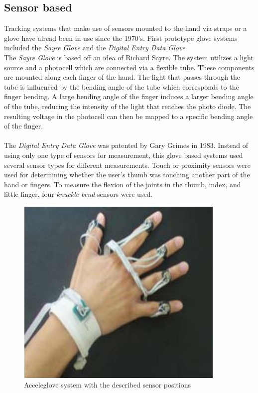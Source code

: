 \subsection{Sensor based}
\label{Sensor based}
Tracking systems that make use of sensors mounted to the hand via straps or a glove have alread been in use since the 1970's. First prototype glove systems included the \textit{Sayre Glove}\cite{ThomasA.DeFanti.1977} and the \textit{Digital Entry Data Glove}\cite{Grimes.1983}.\\
The \textit{Sayre Glove} is based off an idea of Richard Sayre. The system utilizes a light source and a photocell which are connected via a flexible tube. These components are mounted along each finger of the hand. The light that passes through the tube is influenced by the bending angle of the tube which corresponds to the finger bending.
A large bending angle of the finger induces a larger bending angle of the tube, reducing the intensity of the light that reaches the photo diode. The resulting voltage in the photocell can then be mapped to a specific bending angle of the finger.\\\\
The \textit{Digital Entry Data Glove} was patented by Gary Grimes in 1983. Instead of using only one type of sensors for measurement, this glove based systems used several sensor types for different measurements.
Touch or proximity sensors were used for determining whether the user's thumb was touching another part of the hand or fingers. To measure the flexion of the joints in the thumb, index, and little finger, four \textit{knuckle-bend} sensors were used.
\begin{figure}
\label{acceleglove}
\includegraphics[scale=0.5]{images/acceleglove.JPG} 
\caption{Acceleglove system with the described sensor positions \cite{HernandezRebollar.2002}}
\end{figure}
